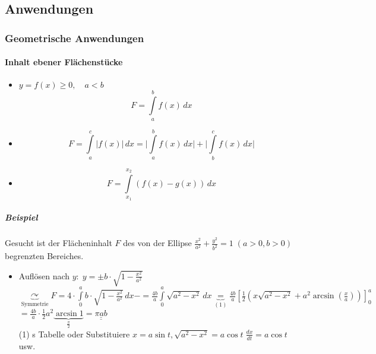 \documentclass[a4paper]{scrartcl}
\begin{document}
\subsection{Anwendungen}
\subsubsection{Geometrische Anwendungen}
\paragraph{Inhalt ebener Flächenstücke}
\begin{itemize}
\item $y=f(x) \geq  0, \quad a<b$\\
\[ F=\int\limits_a^b f(x) \, dx\]
\item \[F= \int\limits_a^c \lvert f(x) \rvert \, dx = \lvert \int\limits_a^b f(x) \, dx \rvert + \lvert \int\limits_b^c  f(x) \, dx \rvert \]
\item \[ F= \int\limits_{x_1}^{x_2} (f(x) - g(x) ) \, dx\]
\end{itemize}

\subparagraph{Beispiel} Gesucht ist der Flächeninhalt $F$ des von der Ellipse $\frac{x^2}{a^2} + \frac{y^2}{b^2} = 1 \; (a >0, b>0)$ begrenzten Bereiches.
\begin{itemize}
\item Auflösen nach $y: \; y= \pm b \cdot \sqrt{1-\frac{x^2}{a^2}}$\\
$\underbrace{\curvearrowright}_{\text{Symmetrie}} F= 4 \cdot \int\limits_0^a b \cdot \sqrt{1-\frac{x^2}{a^2}} \, dx -= \frac{4b}{a} \int\limits_0^a \sqrt{a^2-x^2} \, dx \underbrace{=}_{(1)} \frac{4b}{a} \left [ \frac{1}{2} ( x \sqrt{a^2-x^2} + a^2 \arcsin{(\frac{x}{a})} ) \right ]_0^a$\\
$=\frac{4b}{a} \cdot \frac{1}{2} a^2 \underbrace{\arcsin{1}}_{\frac{\pi}{2}} = \underline{\underline{\pi a b}}$\\
(1) s Tabelle oder Substituiere $x= a \sin{t}, \sqrt{a^2-x^2} = a \cos{t} \; \frac{dx}{dt} = a \cos{t}$ usw.
\end{itemize}
\end{document}
